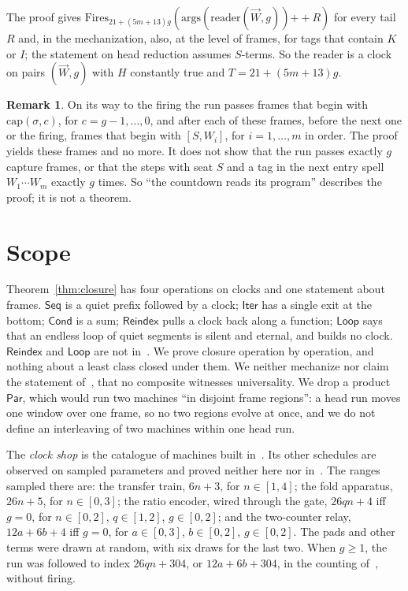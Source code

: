 \documentclass[11pt]{amsart}
\theoremstyle{definition}
\newtheorem{remark}[theorem]{Remark}
\newcommand{\app}{\mathbin{+\!\!+}}
\newcommand{\args}{\mathrm{args}}
\newcommand{\Fires}{\mathrm{Fires}}
\newcommand{\capf}{\mathrm{cap}}
\newcommand{\rd}{\mathrm{reader}}
\newcommand{\Seq}{\mathsf{Seq}}
\newcommand{\Iter}{\mathsf{Iter}}
\newcommand{\Loop}{\mathsf{Loop}}
\newcommand{\Cond}{\mathsf{Cond}}
\newcommand{\Reindex}{\mathsf{Reindex}}
\newcommand{\Par}{\mathsf{Par}}
\begin{document}
The proof gives $\Fires_{21+(5m+13)g}(\args(\rd(\vec W,g))\app R)$ for every tail $R$ and, in the
mechanization, also, at the level of frames, for tags that contain $K$ or $I$; the statement on
head reduction assumes $S$-terms. So the reader is a clock on pairs
$(\vec W,g)$ with $H$ constantly true and $T=21+(5m+13)g$.

\begin{remark}\label{rem:reads}
On its way to the firing the run passes frames that begin with $\capf(\sigma,c)$, for
$c=g-1,\dots,0$, and after each of these frames, before the next one or the firing, frames that
begin with $[S,W_i]$, for $i=1,\dots,m$ in order. The proof yields these frames and no more. It
does not show that the run passes exactly $g$ capture frames, or that the steps with seat $S$ and a
tag in the next entry spell $W_1\cdots W_m$ exactly $g$ times. So ``the countdown reads its
program'' describes the proof; it is not a theorem.
\end{remark}

\section{Scope}\label{sec:scope}

Theorem~\ref{thm:closure} has four operations on clocks and one statement about frames. $\Seq$ is
a quiet prefix followed by a clock; $\Iter$ has a single exit at the bottom; $\Cond$ is a sum;
$\Reindex$ pulls a clock back along a function; $\Loop$ says that an endless loop of quiet segments
is silent and eternal, and builds no clock. $\Reindex$ and $\Loop$ are not in~\citep{clocknote}.
We prove closure operation by operation, and nothing about a least class closed under them. We
neither mechanize nor claim the statement of~\citep[Theorem~2]{clocknote}, that no composite
witnesses universality. We drop a product $\Par$, which would run two machines ``in disjoint frame
regions'': a head run moves one window over one frame, so no two regions evolve at once, and we do
not define an interleaving of two machines within one head run.

The \emph{clock shop} is the catalogue of machines built in~\citep[\S\,The clock shop]{murm2}.
Its other schedules are observed on sampled parameters and proved neither here nor
in~\citep{murm2}. The ranges sampled there are: the transfer train, $6n+3$, for $n\in[1,4]$; the
fold apparatus, $26n+5$, for $n\in[0,3]$; the ratio encoder, wired through the gate, $26qn+4$ iff
$g=0$, for $n\in[0,2]$, $q\in[1,2]$, $g\in[0,2]$; and the two-counter relay, $12a+6b+4$ iff
$g=0$, for $a\in[0,3]$, $b\in[0,2]$, $g\in[0,2]$. The pads and other terms were drawn at random,
with six draws for the last two. When $g\ge1$, the run was followed to index $26qn+304$, or
$12a+6b+304$, in the counting of~\citep{murm2}, without firing.
\end{document}
